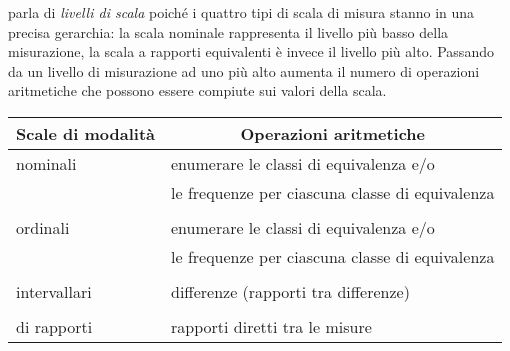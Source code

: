 \citet{stevens46} parla di \emph{livelli di scala} poiché i quattro tipi di scala di misura stanno in una precisa gerarchia: la scala nominale rappresenta il livello più basso della misurazione, la scala a rapporti equivalenti è invece il livello più alto. 
% 
%  
Passando da un livello di misurazione ad uno più alto aumenta il numero di operazioni aritmetiche che possono essere compiute sui valori della scala.
 
  \begin{center}
    \begin{tabular}{l l}\hline
      \multicolumn{1}{c}{Scale di modalit{\`a}}&
      \multicolumn{1}{c}{Operazioni aritmetiche}\\
      \hline
      nominali   &  enumerare le classi di equivalenza e/o\\
                 &  le frequenze per ciascuna classe di equivalenza\\
                 &  \\
      ordinali   &  enumerare le classi di equivalenza e/o\\
                 &  le frequenze per ciascuna classe di equivalenza\\
                 & \\
      intervallari &  differenze (rapporti tra differenze)\\
                 & \\
      di rapporti   &  rapporti diretti tra le misure \\\hline
    \end{tabular}
  \end{center}
  
